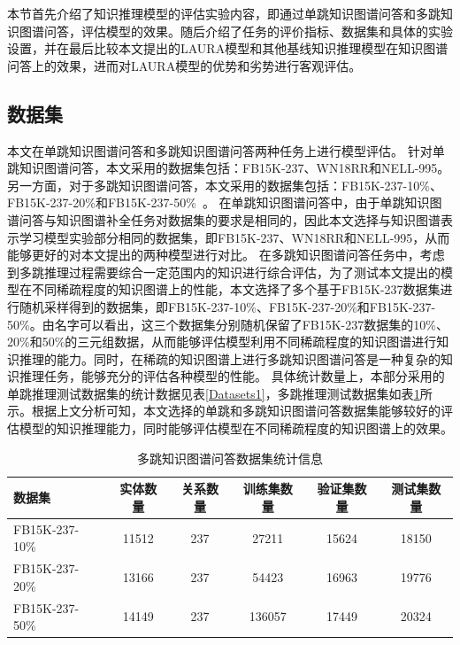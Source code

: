 \documentclass[algorithmlist, AutoFakeBold, AutoFakeSlant, figurelist, tablelist, nomlist, engineering]{seuthesix}
\begin{document}
本节首先介绍了知识推理模型的评估实验内容，即通过单跳知识图谱问答和多跳知识图谱问答，评估模型的效果。随后介绍了任务的评价指标、数据集和具体的实验设置，并在最后比较本文提出的LAURA模型和其他基线知识推理模型在知识图谱问答上的效果，进而对LAURA模型的优势和劣势进行客观评估。

\subsection{数据集}
本文在单跳知识图谱问答和多跳知识图谱问答两种任务上进行模型评估。
针对单跳知识图谱问答，本文采用的数据集包括：FB15K-237、WN18RR和NELL-995。
另一方面，对于多跳知识图谱问答，本文采用的数据集包括：FB15K-237-10\%、FB15K-237-20\%和FB15K-237-50\%~\cite{lv2020dynamic}。
在单跳知识图谱问答中，由于单跳知识图谱问答与知识图谱补全任务对数据集的要求是相同的，因此本文选择与知识图谱表示学习模型实验部分相同的数据集，即FB15K-237、WN18RR和NELL-995，从而能够更好的对本文提出的两种模型进行对比。
在多跳知识图谱问答任务中，考虑到多跳推理过程需要综合一定范围内的知识进行综合评估，为了测试本文提出的模型在不同稀疏程度的知识图谱上的性能，本文选择了多个基于FB15K-237数据集进行随机采样得到的数据集，即FB15K-237-10\%、FB15K-237-20\%和FB15K-237-50\%。由名字可以看出，这三个数据集分别随机保留了FB15K-237数据集的10\%、20\%和50\%的三元组数据，从而能够评估模型利用不同稀疏程度的知识图谱进行知识推理的能力。同时，在稀疏的知识图谱上进行多跳知识图谱问答是一种复杂的知识推理任务，能够充分的评估各种模型的性能。
具体统计数量上，本部分采用的单跳推理测试数据集的统计数据见表\ref{Datasets1}，多跳推理测试数据集如表\ref{Datasets2}所示。根据上文分析可知，本文选择的单跳和多跳知识图谱问答数据集能够较好的评估模型的知识推理能力，同时能够评估模型在不同稀疏程度的知识图谱上的效果。

\begin{table}
  \centering
  \begin{tabular*}{0.95\textwidth}{@{\extracolsep{\fill}}lccccc}
		\toprule[1pt]
    数据集 & 实体数量 & 关系数量 & 训练集数量 & 验证集数量 & 测试集数量 \\ \hline
    FB15K-237-10\% & 11512 & 237 & 27211 & 15624 & 18150\\
    FB15K-237-20\% & 13166 & 237 & 54423 & 16963 & 19776\\
    FB15K-237-50\% & 14149 & 237 & 136057 & 17449 & 20324\\
		\bottomrule[1pt]
	\end{tabular*}
  \caption{多跳知识图谱问答数据集统计信息}
  \label{Datasets2}
\end{table}
\end{document}
